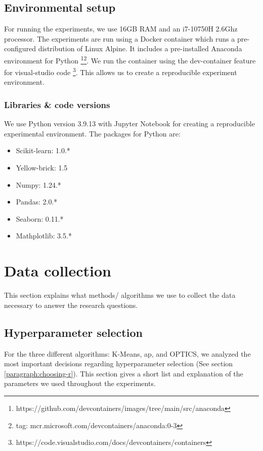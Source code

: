 \subsection{Environmental setup}
For running the experiments, we use 16GB RAM and an i7-10750H 2.6Ghz processor.
The experiments are run using a Docker container which runs a pre-configured distribution of Linux Alpine.
It includes a pre-installed Anaconda environment for Python \footnote{https://github.com/devcontainers/images/tree/main/src/anaconda}\footnote{tag: mcr.microsoft.com/devcontainers/anaconda:0-3}.
We run the container using the dev-container feature for visual-studio code \footnote{https://code.visualstudio.com/docs/devcontainers/containers}.
This allows us to create a reproducible experiment environment.
\subsubsection{Libraries \& code versions}
We use Python version 3.9.13 with Jupyter Notebook for creating a reproducible experimental environment.
The packages for Python are:
\begin{itemize}
  \item Scikit-learn: 1.0.*
  \item Yellow-brick: 1.5
  \item Numpy: 1.24.*
  \item Pandas: 2.0.*
  \item Seaborn: 0.11.*
  \item Mathplotlib: 3.5.*
\end{itemize}

\section{Data collection}
This section explains what methods/ algorithms we use to collect the data necessary to answer the research questions.
\subsection{Hyperparameter selection}
For the three different algorithms: K-Means, \gls{ap}, and OPTICS, we analyzed the most important decisions regarding hyperparameter selection (See section \ref{paragraph:choosing-r}).
This section gives a short list and explanation of the parameters we used throughout the experiments.
